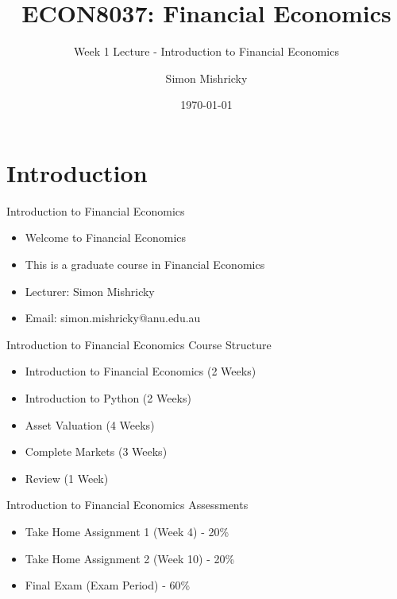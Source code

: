 \documentclass[aspectratio=169,xcolor=dvipsnames]{beamer}
\title{ECON8037: Financial Economics}
\subtitle{\normalsize Week 1 Lecture - Introduction to Financial Economics}
\author{Simon Mishricky}
\institute{Research School of Economics, Australian National University}
\date{\today}
\begin{document}
\section{Introduction}
\frame{\titlepage}

\begin{frame}{Introduction to Financial Economics}
    \begin{itemize}
        \item Welcome to Financial Economics
        \item This is a graduate course in Financial Economics
        \item Lecturer: Simon Mishricky
        \item Email: simon.mishricky@anu.edu.au
    \end{itemize}
\end{frame}

\begin{frame}{Introduction to Financial Economics}
    Course Structure
    \begin{itemize}
        \item Introduction to Financial Economics (2 Weeks)
        \item Introduction to Python (2 Weeks)
        \item Asset Valuation (4 Weeks)
        \item Complete Markets (3 Weeks)
        \item Review (1 Week)
    \end{itemize}
\end{frame}

\begin{frame}{Introduction to Financial Economics}
    Assessments
    \begin{itemize}
        \item Take Home Assignment 1 (Week 4) - 20\%
        \item Take Home Assignment 2 (Week 10) - 20\%
        \item Final Exam (Exam Period) - 60\%
    \end{itemize}
\end{frame}
\end{document}
